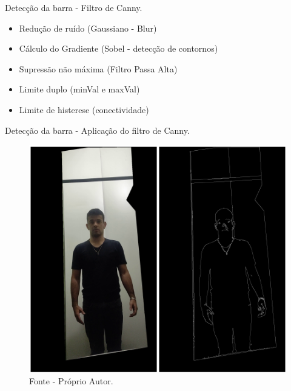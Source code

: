 \begin{frame}{Detecção da barra - Filtro de Canny.}
    \begin{itemize}
        \item  Redução de ruído         (Gaussiano - Blur)
        \item  Cálculo do Gradiente     (Sobel - detecção de contornos)
        \item  Supressão não máxima     (Filtro Passa Alta) 
        \item  Limite duplo             (minVal e maxVal)
        \item  Limite de histerese      (conectividade)
    \end{itemize}
\end{frame}

\begin{frame}{Detecção da barra - Aplicação do filtro de Canny.}
    \begin{figure}[!ht]
    \centering
    \includegraphics[scale=0.45]{img/desenvolvimento/detectaBarra/canny.png}
    \caption*{Fonte - Próprio Autor.}
    \end{figure}
\end{frame}




